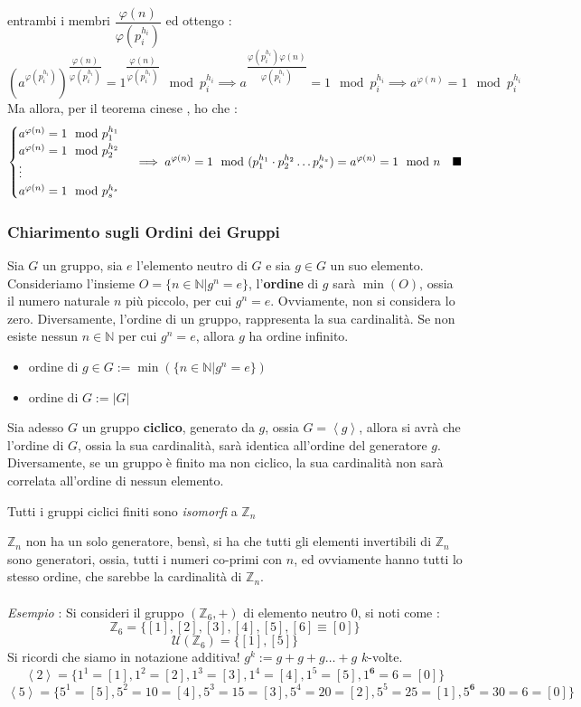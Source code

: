 \documentclass[12pt, letterpaper]{article}
\newcommand{\Z}{{\mathbb Z}}
\newcommand{\N}{{\mathbb N}}
\newcommand{\spaz}{{\text{\hphantom{aa}}}}
\newcommand{\acc}{\\\hphantom{}\\}
\begin{document}
entrambi i membri \(\dfrac{\varphi(n)}{\varphi(p_i^{h_i})}\) ed ottengo : 
$$(a^{\varphi(p_i^{h_i})})^{\dfrac{\varphi(n)}{\varphi(p_i^{h_i})}}=1^{\dfrac{\varphi(n)}{\varphi(p_i^{h_i})}}\mod p_i^{h_i}\implies
 a^{\dfrac{\varphi(p_i^{h_i})\varphi(n)}{\varphi(p_i^{h_i})}}=1 \mod p_i^{h_i}\implies a^{\varphi(n)}=1 \mod p_i^{h_i}$$
 Ma allora, per il teorema cinese , ho che : $$\begin{cases}
    a^{\varphi(n)}=1 \mod p_1^{h_1}\\
    a^{\varphi(n)}=1 \mod p_2^{h_2}\\\vdots \\ 
    a^{\varphi(n)}=1 \mod p_s^{h_s}
 \end{cases}\implies  a^{\varphi(n)}=1 \mod (p_1^{h_1}\cdot p_2^{h_2}\dots p_s^{h_s})=a^{\varphi(n)}=1 \mod n\spaz\blacksquare$$
\subsubsection{Chiarimento sugli Ordini dei Gruppi}
Sia \(G\) un gruppo, sia \(e\) l'elemento neutro di \(G\) e sia \(g\in G\) un suo elemento. Consideriamo l'insieme 
\(O=\{n\in\N|g^n=e\}\), l'\textbf{ordine} di \(g\) sarà \(\min(O)\), ossia il numero naturale \(n\) più piccolo, per 
cui \(g^n=e\). Ovviamente, non si considera lo zero. Diversamente, l'ordine di un gruppo, rappresenta la sua cardinalità. Se 
non esiste nessun \(n\in\N\) per cui \(g^n=e\), allora \(g\) ha ordine infinito.
\begin{itemize}
    \item ordine di \(g\in G:=\min(\{n\in\N|g^n=e\})\) 
    \item ordine di \(G := |G|\)
\end{itemize}
Sia adesso \(G\) un gruppo \textbf{ciclico}, generato da \(g\), ossia \(G=\left\langle g\right\rangle \), allora si avrà 
che l'ordine di \(G\), ossia la sua cardinalità, sarà identica all'ordine del generatore \(g\). Diversamente, se un gruppo 
è finito ma non ciclico, la sua cardinalità non sarà correlata all'ordine di nessun elemento.\begin{center}
    Tutti i gruppi ciclici finiti sono \textit{isomorfi} a \(\Z_n\)
\end{center}
\(\Z_n\) non ha un solo generatore, bensì, si ha che tutti gli elementi invertibili di \(\Z_n\) sono generatori, ossia, tutti 
i numeri co-primi con \(n\), ed ovviamente hanno tutti lo stesso ordine, che sarebbe la cardinalità di \(\Z_n\).\acc 
\textit{Esempio} : Si consideri il gruppo \((\Z_6,+)\) di elemento neutro \(0\), si noti come : 
$$\Z_6=\{[1],[2],[3],[4],[5],[6]\equiv [0]\}$$
$$\mathcal{U}(\Z_6)=\{[1],[5]\}$$
Si ricordi che siamo in notazione additiva! \(g^k:=g+g+g\dots +g \) \(k\)-volte.
$$\left\langle2\right\rangle=\{1^1=[1],1^2=[2],1^3=[3],1^4=[4],1^5=[5],1^\textbf{6}=6=[0]\} $$
$$\left\langle5\right\rangle=\{5^1=[5],5^2=10=[4],5^3=15=[3],5^4=20=[2],5^5=25=[1],5^\textbf{6}=30=6=[0]\}$$
 
\end{document}
